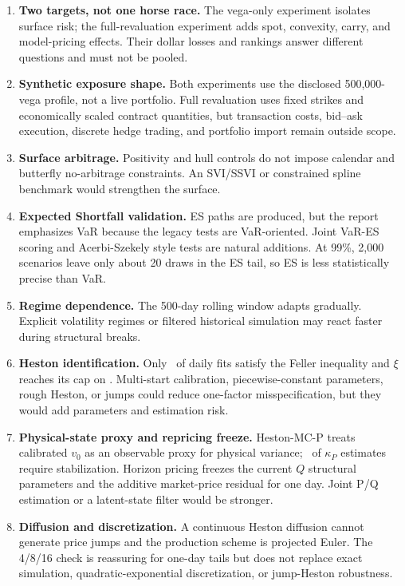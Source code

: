 \documentclass[11pt,a4paper]{article}
\begin{document}
\begin{enumerate}
  \item \textbf{Two targets, not one horse race.} The vega-only experiment isolates surface risk; the
  full-revaluation experiment adds spot, convexity, carry, and model-pricing effects. Their dollar
  losses and rankings answer different questions and must not be pooled.
  \item \textbf{Synthetic exposure shape.} Both experiments use the disclosed 500,000-vega profile,
  not a live portfolio. Full revaluation uses fixed strikes and economically scaled contract
  quantities, but transaction costs, bid--ask execution, discrete hedge trading, and portfolio
  import remain outside scope.
  \item \textbf{Surface arbitrage.} Positivity and hull controls do not impose calendar and butterfly
  no-arbitrage constraints. An SVI/SSVI or constrained spline benchmark would strengthen the surface.
  \item \textbf{Expected Shortfall validation.} ES paths are produced, but the report emphasizes VaR
  because the legacy tests are VaR-oriented. Joint VaR-ES scoring and Acerbi-Szekely style tests are
  natural additions. At 99\%, 2,000 scenarios leave only about 20 draws in the ES tail, so ES is less
  statistically precise than VaR.
  \item \textbf{Regime dependence.} The 500-day rolling window adapts gradually. Explicit volatility
  regimes or filtered historical simulation may react faster during structural breaks.
  \item \textbf{Heston identification.} Only \HestonFellerShare\ of daily fits satisfy the Feller
  inequality and $\xi$ reaches its cap on \HestonXiBoundShare. Multi-start calibration,
  piecewise-constant parameters, rough Heston, or jumps could reduce one-factor misspecification,
  but they would add parameters and estimation risk.
  \item \textbf{Physical-state proxy and repricing freeze.} Heston-MC-P treats calibrated $v_0$ as an
  observable proxy for physical variance; \PhysicalKappaBoundShare\ of $\kappa_P$ estimates require
  stabilization. Horizon pricing freezes the current $Q$ structural parameters and the additive
  market-price residual for one day. Joint P/Q estimation or a latent-state filter would be stronger.
  \item \textbf{Diffusion and discretization.} A continuous Heston diffusion cannot generate price
  jumps and the production scheme is projected Euler. The 4/8/16 check is reassuring for one-day
  tails but does not replace exact simulation, quadratic-exponential discretization, or jump-Heston
  robustness.
\end{enumerate}
\end{document}

